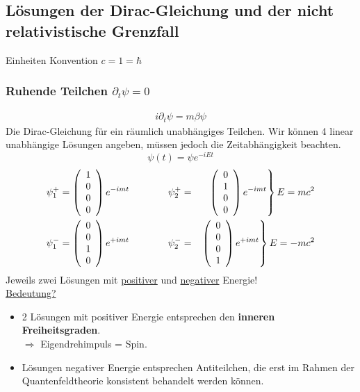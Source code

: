 \subsection{Lösungen der Dirac-Gleichung und der nicht relativistische Grenzfall}
Einheiten Konvention $\boxed{c=1=\hbar}$
\subsubsection{Ruhende Teilchen $\partial_t \psi = 0$}
\begin{eqnarray*}
i\partial_t \psi = m \beta \psi
\end{eqnarray*}
Die Dirac-Gleichung für ein räumlich unabhängiges Teilchen. Wir können 4 linear unabhängige Lösungen angeben, müssen jedoch die Zeitabhängigkeit beachten.
$$\psi(t) = \psi e^{-iEt}$$
\begin{alignat*}{4}
\psi_1^+ = \left( \begin{array}{c} 1\\0\\0\\0\end{array}\right ) e^{-imt} \qquad\qquad \psi_2^+ &=&  
\left . \left(\begin{array}{c} 0\\1\\0\\0\end{array}\right ) e^{-imt} \right \} E = m c^2\\
\psi_1^- = \left( \begin{array}{c} 0\\0\\1\\0\end{array}\right ) e^{+imt} \qquad\qquad \psi_2^- &=&  
\left . \left(\begin{array}{c} 0\\0\\0\\1\end{array}\right ) e^{+imt} \right \} E = -m c^2
\end{alignat*}
Jeweils zwei Lösungen mit \underline{positiver} und \underline{negativer} Energie!\\
\underline{Bedeutung?}
\begin{itemize}
\item 2 Lösungen mit positiver Energie entsprechen den {\bf inneren Freiheitsgraden}.\\
$\Longrightarrow$ Eigendrehimpuls = Spin.
\item Lösungen negativer Energie entsprechen Antiteilchen, die erst im Rahmen der Quantenfeldtheorie konsistent behandelt werden können.
\end{itemize}


